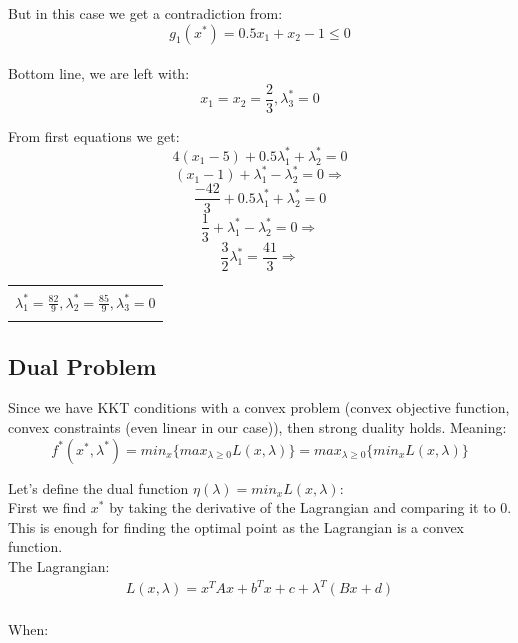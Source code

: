 \documentclass[12pt]{article}
\newcommand{\rectres}[1]{
\begin{center}
\begin{tabular}{ |c| }
\hline
\\
 #1\\
 \\
\hline
\end{tabular}
\end{center}
}
\begin{document}
But in this case we get a contradiction from:
$$ g_1(x^*) = 0.5x_1 +x_2 -1 \leq 0$$\\

Bottom line, we are left with:\\
$$x_1=x_2=\frac{2}{3},\lambda^*_3=0$$

From first equations we get:\\
$$4(x_1-5)  + 0.5\lambda^*_1 +\lambda^*_2 = 0$$
$$(x_1-1)  + \lambda^*_1 -\lambda^*_2 = 0 \Rightarrow$$
$$\frac{-42}{3}  + 0.5\lambda^*_1 +\lambda^*_2 = 0$$
$$\frac{1}{3}  + \lambda^*_1 -\lambda^*_2 = 0 \Rightarrow$$
$$\frac{3}{2}\lambda^*_1 = \frac{41}{3} \Rightarrow$$
\rectres{$\lambda^*_1 = \frac{82}{9},\lambda^*_2 = \frac{85}{9}, \lambda^*_3=0$}

\subsection{Dual Problem}

Since we have KKT conditions with a convex problem (convex objective function, convex constraints (even linear in our case)), then strong duality holds. Meaning:\\
$$f^*(x^*,\lambda^*) = min_x \{max_{\lambda \geq 0} L(x,\lambda)\} =  max_{\lambda \geq 0}\{min_x L(x,\lambda)\}$$

Let's define the dual function $\eta(\lambda) = min_x L(x,\lambda)$:\\

First we find $x^*$ by taking the derivative of the Lagrangian and comparing it to 0. This is enough for finding the optimal point as the Lagrangian is a convex function.\\

The Lagrangian:
\begin{gather*}
    L(x,\lambda) =  x^TAx + b^Tx + c + \lambda^T (Bx + d)\\
\end{gather*}

When:\\
\end{document}
